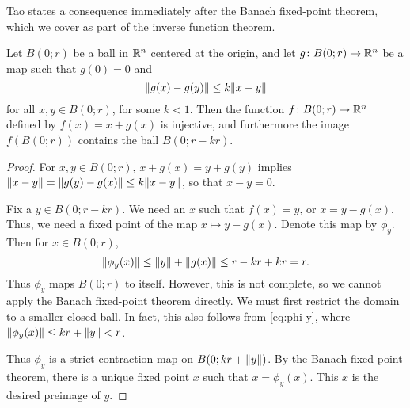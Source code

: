 Tao states a consequence immediately after the Banach fixed-point theorem,
which we cover as part of the inverse function theorem.
\begin{lemma}
    Let $B(0; r)$ be a ball in $\mathbb{R}^n$ centered at the origin, and let
    $g\colon B(0; r) \to \mathbb{R}^n$ be a map such that $g(0) = 0$ and \[
        \lVert g(x) - g(y)\rVert \le k \lVert x - y\rVert
    \] for all $x, y \in B(0; r)$, for some $k < 1$.
    Then the function $f\colon B(0; r) \to \mathbb{R}^n$ defined by
    $f(x) = x + g(x)$ is injective, and furthermore the image $f(B(0; r))$
    contains the ball $B(0; r - kr)$.
\end{lemma}
\begin{proof}
    For $x, y \in B(0; r)$, $x + g(x) = y + g(y)$ implies
    $\lVert x - y\rVert = \lVert g(y) - g(x)\rVert \le k \lVert x - y\rVert$, so that
    $x - y = 0$.

    Fix a $y \in B(0; r - kr)$.
    We need an $x$ such that $f(x) = y$, or $x = y - g(x)$.
    Thus, we need a fixed point of the map $x \mapsto y - g(x)$.
    Denote this map by $\phi_y$.
    Then for $x \in B(0; r)$, \begin{equation}
        \lVert\phi_y(x)\rVert \le \lVert y\rVert + \lVert g(x)\rVert
            \le r - kr + kr = r. \label{eq:phi-y}
    \end{equation} Thus $\phi_y$ maps $B(0; r)$ to itself.
    However, this is not complete, so we cannot apply the Banach fixed-point
    theorem directly.
    We must first restrict the domain to a smaller closed ball.
    In fact, this also follows from \cref{eq:phi-y}, where
    $\lVert\phi_y(x)\rVert \le kr + \lVert y\rVert < r$.

    Thus $\phi_y$ is a strict contraction map on $B(0; kr + \lVert y\rVert)$.
    By the Banach fixed-point theorem, there is a unique fixed point $x$
    such that $x = \phi_y(x)$.
    This $x$ is the desired preimage of $y$.
\end{proof}
